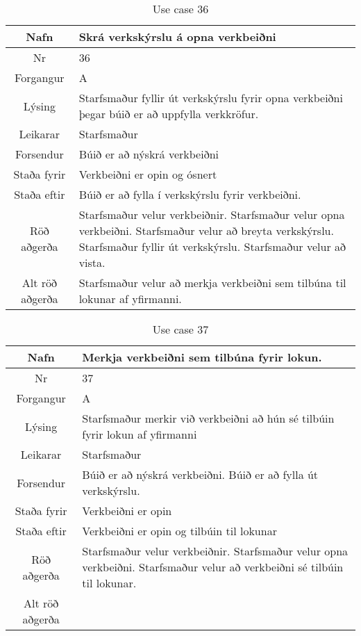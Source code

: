 \begin{table}[h!]\centering
\begin{tabular}{|c|p{10cm}|}
\hline
Nafn&Skrá verkskýrslu á opna verkbeiðni\\
\hline
Nr&36\\
\hline
Forgangur&A\\
\hline
Lýsing&Starfsmaður fyllir út verkskýrslu fyrir opna verkbeiðni þegar búið er að uppfylla verkkröfur.\\
\hline
Leikarar&Starfsmaður\\
\hline
Forsendur&Búið er að nýskrá verkbeiðni\\
\hline
Staða fyrir&Verkbeiðni er opin og ósnert\\
\hline
Staða eftir&Búið er að fylla í verkskýrslu fyrir verkbeiðni.\\
\hline
Röð aðgerða&Starfsmaður velur verkbeiðnir. Starfsmaður velur opna verkbeiðni. Starfsmaður velur að breyta verkskýrslu. Starfsmaður fyllir út verkskýrslu. Starfsmaður velur að vista.\\
\hline
Alt röð aðgerða&Starfsmaður velur að merkja verkbeiðni sem tilbúna til lokunar af yfirmanni.\\
\hline
\end{tabular}
\caption{Use case 36}\label{tab:use_case_36}
\end{table}
\begin{table}[h!]\centering
\begin{tabular}{|c|p{10cm}|}
\hline
Nafn&Merkja verkbeiðni sem tilbúna fyrir lokun.\\
\hline
Nr&37\\
\hline
Forgangur&A\\
\hline
Lýsing&Starfsmaður merkir við verkbeiðni að hún sé tilbúin fyrir lokun af yfirmanni\\
\hline
Leikarar&Starfsmaður\\
\hline
Forsendur&Búið er að nýskrá verkbeiðni. Búið er að fylla út verkskýrslu.\\
\hline
Staða fyrir&Verkbeiðni er opin\\
\hline
Staða eftir&Verkbeiðni er opin og tilbúin til lokunar\\
\hline
Röð aðgerða&Starfsmaður velur verkbeiðnir. Starfsmaður velur opna verkbeiðni. Starfsmaður velur að verkbeiðni sé tilbúin til lokunar.\\
\hline
Alt röð aðgerða&\\
\hline
\end{tabular}
\caption{Use case 37}\label{tab:use_case_37}
\end{table}

